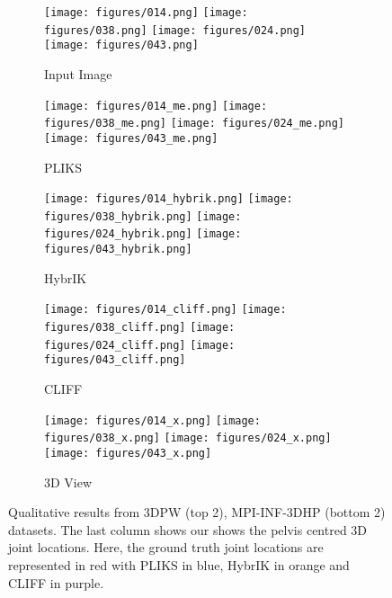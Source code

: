 \documentclass[10pt,twocolumn,letterpaper]{article}
\begin{document}
\begin{figure*}[ht]
	\centering
	\begin{subfigure}[b]{0.195\textwidth}
	\centering
	    \texttt{[image: figures/014.png]}
         \texttt{[image: figures/038.png]}
         \texttt{[image: figures/024.png]}
         \texttt{[image: figures/043.png]}
         

    \caption*{Input Image}
    \end{subfigure}
    \begin{subfigure}[b]{0.195\textwidth}
	\centering
	     \texttt{[image: figures/014\_me.png]}
         \texttt{[image: figures/038\_me.png]}
         \texttt{[image: figures/024\_me.png]}
         \texttt{[image: figures/043\_me.png]}
    \caption*{PLIKS}
    \end{subfigure}
        \begin{subfigure}[b]{0.195\textwidth}
	\centering
	     \texttt{[image: figures/014\_hybrik.png]}
         \texttt{[image: figures/038\_hybrik.png]}
         \texttt{[image: figures/024\_hybrik.png]}
         \texttt{[image: figures/043\_hybrik.png]}
    \caption*{HybrIK~\cite{hybrik}}
    \end{subfigure}
	\begin{subfigure}[b]{0.195\textwidth}
	\centering
	     \texttt{[image: figures/014\_cliff.png]}
         \texttt{[image: figures/038\_cliff.png]}
         \texttt{[image: figures/024\_cliff.png]}
         \texttt{[image: figures/043\_cliff.png]}
    \caption*{CLIFF~\cite{cliff}}
    \end{subfigure}
    \begin{subfigure}[b]{0.1096875\textwidth}
	\centering
	     \texttt{[image: figures/014\_x.png]}
         \texttt{[image: figures/038\_x.png]}
         \texttt{[image: figures/024\_x.png]}
         \texttt{[image: figures/043\_x.png]}
    \caption*{3D View}
    \end{subfigure}
    
 	\caption{	\label{fig:final} Qualitative results from  3DPW (top 2), MPI-INF-3DHP (bottom 2) datasets. The last column shows our shows the pelvis centred 3D joint locations. Here, the ground truth joint locations are represented in red with PLIKS in blue, HybrIK in orange and CLIFF in purple.}
\end{figure*}
\end{document}
